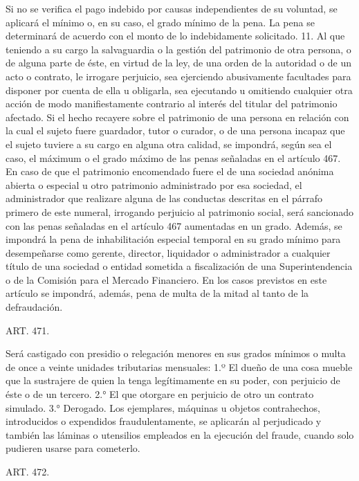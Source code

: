     Si no se verifica el pago indebido por causas independientes de su voluntad, se aplicará el mínimo o, en su caso, el grado mínimo de la pena.
    La pena se determinará de acuerdo con el monto de lo indebidamente solicitado.
    11. Al que teniendo a su cargo la salvaguardia o la gestión del patrimonio de otra persona, o de alguna parte de éste, en virtud de la ley, de una orden de la autoridad o de un acto o contrato, le irrogare perjuicio, sea ejerciendo abusivamente facultades para disponer por cuenta de ella u obligarla, sea ejecutando u omitiendo cualquier otra acción de modo manifiestamente contrario al interés del titular del patrimonio afectado.
    Si el hecho recayere sobre el patrimonio de una persona en relación con la cual el sujeto fuere guardador, tutor o curador, o de una persona incapaz que el sujeto tuviere a su cargo en alguna otra calidad, se impondrá, según sea el caso, el máximum o el grado máximo de las penas señaladas en el artículo 467.
    En caso de que el patrimonio encomendado fuere el de una sociedad anónima abierta o especial u otro patrimonio administrado por esa sociedad, el administrador que realizare alguna de las conductas descritas en el párrafo primero de este numeral, irrogando perjuicio al patrimonio social, será sancionado con las penas señaladas en el artículo 467 aumentadas en un grado. Además, se impondrá la pena de inhabilitación especial temporal en su grado mínimo para desempeñarse como gerente, director, liquidador o administrador a cualquier título de una sociedad o entidad sometida a fiscalización de una Superintendencia o de la Comisión para el Mercado Financiero.
    En los casos previstos en este artículo se impondrá, además, pena de multa de la mitad al tanto de la defraudación.






    ART. 471.

    Será castigado con presidio o relegación menores en sus grados mínimos o multa de once a veinte unidades tributarias mensuales:
    1.º El dueño de una cosa mueble que la sustrajere de quien la tenga legítimamente en su poder, con perjuicio de éste o de un tercero.
    2.° El que otorgare en perjuicio de otro un contrato simulado.
    3.° Derogado.
    Los ejemplares, máquinas u objetos contrahechos, introducidos o expendidos fraudulentamente, se aplicarán al perjudicado y también las láminas o utensilios empleados en la ejecución del fraude, cuando solo pudieren usarse para cometerlo.

    ART. 472.

